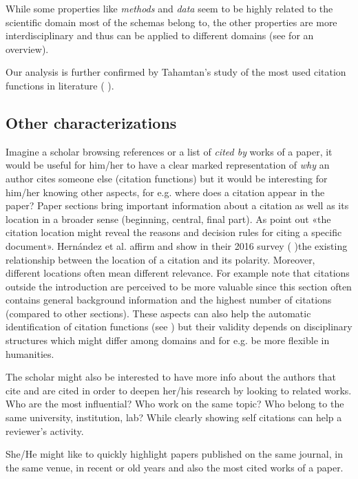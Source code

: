 \documentclass[runningheads,a4paper]{llncs}
\begin{document}
While some properties like {\em methods} and {\em data} seem to be highly related to the scientific domain most of the schemas belong to, the other properties are more interdisciplinary and thus can be applied to different domains (see  \cite{__RefNumPara__4695_348126194} for an overview).

Our analysis is further confirmed by Tahamtan's study of the most used citation functions in literature ( \cite{__RefNumPara__4697_348126194}).

\subsection{Other characterizations}\label{__RefHeading__183555_2737330628}

Imagine a scholar browsing references or a list of {\em cited by} works of a paper, it would be useful for him/her to have a clear marked representation of {\em why} an author cites someone else (citation functions) but it would be interesting for him/her knowing other aspects, for e.g. where does a citation appear in the paper? Paper sections bring important information about a citation as well as its location in a broader sense (beginning, central, final part). As  \cite{__RefNumPara__4697_348126194} point out «the citation location might reveal the reasons and decision rules for citing a specific document». Hern\'andez et al. affirm and show in their 2016 survey ( \cite{__RefNumPara__4573_348126194})the existing relationship between the location of a citation and its polarity. Moreover, different locations often mean different relevance. For example  \cite{__RefNumPara__3092_348126194} note that citations outside the introduction are perceived to be more valuable since this section often contains general background information and the highest number of citations (compared to other sections). These aspects can also help the automatic identification of citation functions (see  \cite{__RefNumPara__4481_348126194}) but their validity depends on disciplinary structures which might differ among domains and for e.g. be more flexible in humanities.

The scholar might also be interested to have more info about the authors that cite and are cited in order to deepen her/his research by looking to related works. Who are the most influential? Who work on the same topic? Who belong to the same university, institution, lab? While clearly showing self citations can help a reviewer's activity.

She/He might like to quickly highlight papers published on the same journal, in the same venue, in recent or old years and also the most cited works of a paper.
\end{document}
